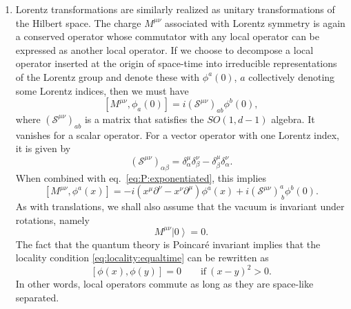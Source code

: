 \documentclass[a4paper,12pt]{article}
\newcommand{\ket}[1]{\left| #1 \right\rangle}
\numberwithin{equation}{section}
\begin{document}
\begin{enumerate}
\item
Lorentz transformations are similarly realized as unitary transformations of the Hilbert space. The charge $M^{\mu\nu}$ associated with Lorentz symmetry is again a conserved operator whose commutator with any local operator can be expressed as another local operator. If we choose to decompose a local operator inserted at the origin of space-time into irreducible representations of the Lorentz group and denote these with $\phi^a(0)$, $a$ collectively denoting some Lorentz indices, then we must have
\begin{equation}
	\left[ M^{\mu\nu}, \phi_a(0) \right]
	= i \left( \mathcal{S}^{\mu\nu} \right)_{ab} \phi^b(0),
\end{equation}
where $\left( \mathcal{S}^{\mu\nu} \right)_{ab}$ is a matrix that satisfies the $SO(1, d-1)$ algebra. It vanishes for a scalar operator. For a vector operator with one Lorentz index, it is given by
\begin{equation}
	\left( \mathcal{S}^{\mu\nu} \right)_{\alpha\beta}
	= \delta^\mu_\alpha \delta^\nu_\beta
	- \delta^\mu_\beta \delta^\nu_\alpha.
	\label{eq:spinop:vector}
\end{equation}
When combined with eq.~\eqref{eq:P:exponentiated}, this implies
\begin{equation}
	\left[ M^{\mu\nu}, \phi^a(x) \right] = 
	-i \left( x^\mu \partial^\nu - x^\nu \partial^\mu \right) \phi^a(x)
	+ i \left( \mathcal{S}^{\mu\nu} \right)^a_{~b} \phi^b(0).
	\label{eq:commutator:M}
\end{equation}
As with translations, we shall also assume that the vacuum is invariant under rotations, namely
\begin{equation}
	M^{\mu\nu} \ket{0} = 0.
\end{equation}
The fact that the quantum theory is Poincaré invariant implies that the locality condition \eqref{eq:locality:equaltime} can be rewritten as
\begin{equation}
	\left[ \phi(x), \phi(y) \right] = 0
	\qquad
	\text{if}~(x-y)^2 > 0.
	\label{eq:causality}
\end{equation}
In other words, local operators commute as long as they are space-like separated.


\end{enumerate}
\end{document}

